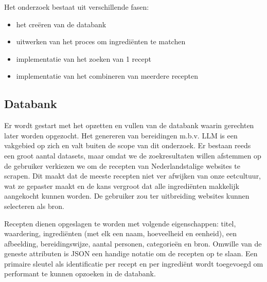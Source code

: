 \documentclass{hogent-article}
\begin{document}
Het onderzoek bestaat uit verschillende fasen:
\begin{itemize}
    \item het creëren van de databank
    \item uitwerken van het proces om ingrediënten te matchen
    \item implementatie van het zoeken van 1 recept
    \item implementatie van het combineren van meerdere recepten
\end{itemize}

\subsection{Databank}%

Er wordt gestart met het opzetten en vullen van de databank waarin gerechten later worden opgezocht. Het genereren van bereidingen m.b.v. LLM is een vakgebied op zich en valt buiten de scope van dit onderzoek. Er bestaan reeds een groot aantal datasets, maar omdat we de zoekresultaten willen afstemmen op de gebruiker verkiezen we om de recepten van Nederlandstalige websites te scrapen. Dit maakt dat de meeste recepten niet ver afwijken van onze eetcultuur, wat ze gepaster maakt en de kans vergroot dat alle ingrediënten makkelijk aangekocht kunnen worden. De gebruiker zou ter uitbreiding websites kunnen selecteren als bron.

Recepten dienen opgeslagen te worden met volgende eigenschappen: titel, waardering, ingrediënten (met elk een naam, hoeveelheid en eenheid), een afbeelding, bereidingswijze, aantal personen, categorieën en bron. Omwille van de geneste attributen is JSON een handige notatie om de recepten op te slaan. Een primaire sleutel als identificatie per recept en per ingrediënt wordt toegevoegd om performant te kunnen opzoeken in de databank.
\end{document}
